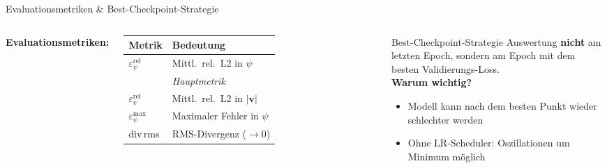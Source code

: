 \documentclass[aspectratio=169]{beamer}
\begin{document}
\begin{frame}{Evaluationsmetriken \& Best-Checkpoint-Strategie}
  \begin{columns}[T]
      \textbf{Evaluationsmetriken:}
      \vspace{6pt}
      \renewcommand{\arraystretch}{1.4}
      \begin{tabular}{ll}
        \toprule
        Metrik & Bedeutung \\
        \midrule
        $\varepsilon_\psi^{\text{rel}}$ & Mittl.\ rel.\ L2 in $\psi$ \\
                                        & \emph{Hauptmetrik} \\[2pt]
        $\varepsilon_v^{\text{rel}}$    & Mittl.\ rel.\ L2 in $|\mathbf{v}|$ \\[2pt]
        $\varepsilon_\psi^{\max}$       & Maximaler Fehler in $\psi$ \\[2pt]
        div\,rms                        & RMS-Divergenz ($\to 0$) \\
        \bottomrule
      \end{tabular}

      \begin{block}{Best-Checkpoint-Strategie}
        Auswertung \textbf{nicht} am letzten Epoch,
        sondern am Epoch mit dem besten Validierungs-Loss.\\[8pt]
        \textbf{Warum wichtig?}
        \begin{itemize}
          \item Modell kann nach dem besten Punkt wieder schlechter werden
          \item Ohne LR-Scheduler: Oszillationen um Minimum möglich
        \end{itemize}
      \end{block}
  \end{columns}
\end{frame}
\end{document}
